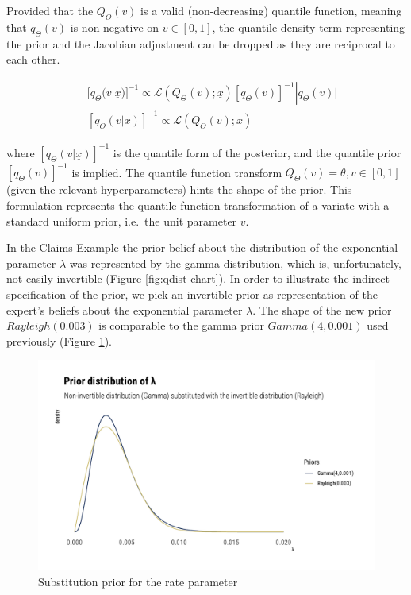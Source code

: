 \documentclass[
  12pt,
]{article}
\begin{document}
Provided that the \(Q_\Theta(v)\) is a valid (non-decreasing) quantile function, meaning that \(q_\Theta(v)\) is non-negative on \(v \in [0,1]\), the quantile density term representing the prior and the Jacobian adjustment can be dropped as they are reciprocal to each other.

\[ 
\begin{aligned}\;
&[q_\Theta(v|\underline{x})]^{-1} \propto \mathcal{L}(Q_\Theta(v);\underline{x})[q_\Theta(v)]^{-1}|q_\Theta(v)| \\
&[q_\Theta(v|\underline{x})]^{-1} \propto \mathcal{L}(Q_\Theta(v);\underline{x})
\end{aligned}
\label{eq:bayesidqfeq}
\]

where \([q_\Theta(v|\underline{x})]^{-1}\) is the quantile form of the posterior, and the quantile prior \([q_\Theta(v)]^{-1}\) is implied. The quantile function transform \(Q_\Theta(v)=\theta,v \in [0,1]\) (given the relevant hyperparameters) hints the shape of the prior. This formulation represents the quantile function transformation of a variate with a standard uniform prior, i.e.~the unit parameter \(v\).

In the Claims Example the prior belief about the distribution of the exponential parameter \(\lambda\) was represented by the gamma distribution, which is, unfortunately, not easily invertible (Figure \ref{fig:qdist-chart}). In order to illustrate the indirect specification of the prior, we pick an invertible prior as representation of the expert's beliefs about the exponential parameter \(\lambda\). The shape of the new prior \(Rayleigh(0.003)\) is comparable to the gamma prior \(Gamma(4,0.001)\) used previously (Figure \ref{fig:gamma-ray-prior-graph}).

\begin{figure}

{\centering \includegraphics[width=0.8\linewidth]{ilbm_article_files/figure-latex/gamma-ray-prior-graph-1} 

}

\caption{Substitution prior for the rate parameter}\label{fig:gamma-ray-prior-graph}
\end{figure}
\end{document}
